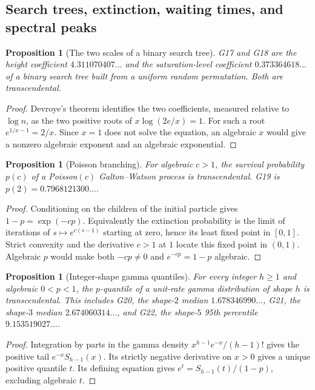 \documentclass[11pt,a4paper]{article}
\newtheorem{proposition}[theorem]{Proposition}
\theoremstyle{definition}
\theoremstyle{remark}
\begin{document}
\subsection{Search trees, extinction, waiting times, and spectral peaks}
\par\hypertarget{cat-G17}{}\label{page:G17}\hypertarget{cat-G18}{}\label{page:G18}
\begin{proposition}[The two scales of a binary search tree]\label{prop:gbst}
G17 and G18 are the height coefficient $4.311070407\ldots$ and the
saturation-level coefficient $0.373364618\ldots$ of a binary search tree
built from a uniform random permutation. Both are transcendental.
\end{proposition}
\begin{proof}
Devroye's theorem \cite{gDev} identifies the two coefficients, measured
relative to $\log n$, as the two positive roots of
$x\log(2e/x)=1$. For such a root
$e^{1/x-1}=2/x$. Since $x=1$ does not solve the equation, an algebraic
$x$ would give a nonzero algebraic exponent and an algebraic exponential.
\end{proof}

\par\hypertarget{cat-G19}{}\label{page:G19}
\begin{proposition}[Poisson branching]\label{prop:gbranch}
For algebraic $c>1$, the survival probability $p(c)$ of a Poisson$(c)$
Galton--Watson process is transcendental. G19 is $p(2)=0.7968121300\ldots$.
\end{proposition}
\begin{proof}
Conditioning on the children of the initial particle gives
$1-p=\exp(-cp)$. Equivalently the extinction probability is the limit
of iterations of $s\mapsto e^{c(s-1)}$ starting at zero, hence its
least fixed point in $[0,1]$. Strict convexity and the derivative $c>1$
at $1$ locate this fixed point in $(0,1)$. Algebraic $p$ would make
both $-cp\ne0$ and $e^{-cp}=1-p$ algebraic.
\end{proof}

\par\hypertarget{cat-G20}{}\label{page:G20}\hypertarget{cat-G21}{}\label{page:G21}\hypertarget{cat-G22}{}\label{page:G22}
\begin{proposition}[Integer-shape gamma quantiles]\label{prop:gerald}
For every integer $h\ge1$ and algebraic $0<p<1$, the $p$-quantile of
a unit-rate gamma distribution of shape $h$ is transcendental.
This includes G20, the shape-$2$ median $1.678346990\ldots$,
G21, the shape-$3$ median $2.674060314\ldots$, and G22, the
shape-$5$ 95th percentile $9.153519027\ldots$.
\end{proposition}
\begin{proof}
Integration by parts in the gamma density $x^{h-1}e^{-x}/(h-1)!$
gives the positive tail $e^{-x}S_{h-1}(x)$. Its strictly negative
derivative on $x>0$ gives a unique positive quantile $t$. Its defining
equation gives $e^t=S_{h-1}(t)/(1-p)$, excluding algebraic $t$.
\end{proof}
\end{document}
